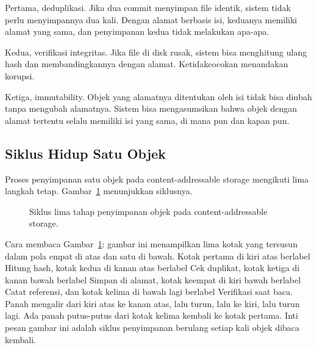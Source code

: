 \documentclass[11pt,a4paper]{article}
\begin{document}
Pertama, deduplikasi. Jika dua commit menyimpan file identik, sistem tidak perlu menyimpannya dua kali. Dengan alamat berbasis isi, keduanya memiliki alamat yang sama, dan penyimpanan kedua tidak melakukan apa-apa.

Kedua, verifikasi integritas. Jika file di disk rusak, sistem bisa menghitung ulang hash dan membandingkannya dengan alamat. Ketidakcocokan menandakan korupsi.

Ketiga, immutability. Objek yang alamatnya ditentukan oleh isi tidak bisa diubah tanpa mengubah alamatnya. Sistem bisa mengasumsikan bahwa objek dengan alamat tertentu selalu memiliki isi yang sama, di mana pun dan kapan pun.

\subsection{Siklus Hidup Satu Objek}

Proses penyimpanan satu objek pada content-addressable storage mengikuti lima langkah tetap. Gambar~\ref{fig:cycle} menunjukkan siklusnya.

\begin{figure}[H]
	\centering
	\caption{Siklus lima tahap penyimpanan objek pada content-addressable storage.}
	\label{fig:cycle}
\end{figure}

Cara membaca Gambar~\ref{fig:cycle}: gambar ini menampilkan lima kotak yang tersusun dalam pola empat di atas dan satu di bawah. Kotak pertama di kiri atas berlabel Hitung hash, kotak kedua di kanan atas berlabel Cek duplikat, kotak ketiga di kanan bawah berlabel Simpan di alamat, kotak keempat di kiri bawah berlabel Catat referensi, dan kotak kelima di bawah lagi berlabel Verifikasi saat baca. Panah mengalir dari kiri atas ke kanan atas, lalu turun, lalu ke kiri, lalu turun lagi. Ada panah putus-putus dari kotak kelima kembali ke kotak pertama. Inti pesan gambar ini adalah siklus penyimpanan berulang setiap kali objek dibaca kembali.
\end{document}
